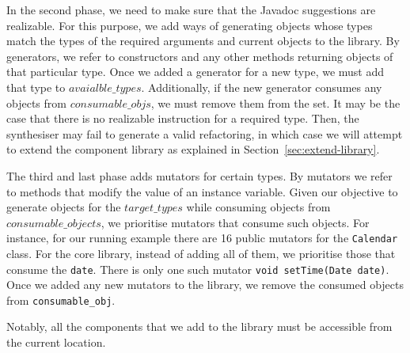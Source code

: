 \documentclass[sigconf,review,anonymous]{acmart}
\begin{document}
In the second phase, we need to make sure that the Javadoc suggestions
are realizable. For this purpose, we add ways of generating
objects whose types match the types of the required arguments and current objects to the library.
%
By generators, we refer to constructors and any other methods returning objects of that particular type.
Once we added a generator for a new type, we must add that type to $avaialble\_types$.
Additionally, if the new generator consumes any objects from $consumable\_objs$,
we must remove them from the set.
It may be the case that there is no realizable instruction for a required type.
Then, the synthesiser may fail to generate a valid refactoring, in which
case we will attempt to extend the component library as explained in Section~\ref{sec:extend-library}.

The third and last phase adds  mutators for certain types.
By mutators we refer to methods that modify the value of an instance variable.
Given our objective to generate objects for the $target\_types$ while consuming objects from $consumable\_objects$,
we prioritise mutators that consume such objects.
For instance, for our running example there are 16 public mutators for the \texttt{Calendar} class.
For the core library, instead of adding all of them, we prioritise those that
consume the \texttt{date}. There is only one such mutator \texttt{void setTime(Date date)}.
Once we added any new mutators to the library, we remove the consumed objects from \texttt{consumable\_obj}.


Notably, all the components that
we add to the library must be accessible from the current location.

\end{document}
